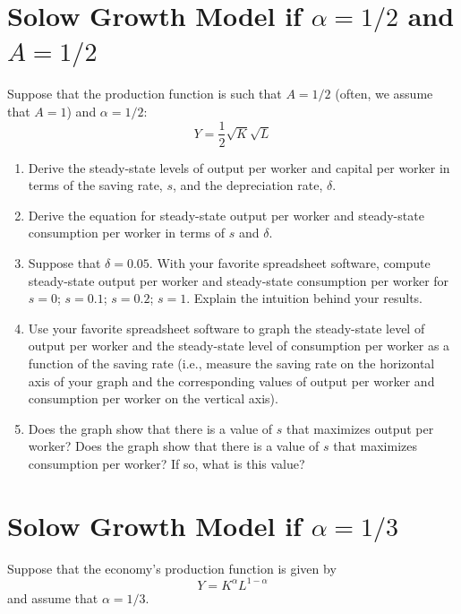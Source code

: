 \documentclass[]{book}
\theoremstyle{definition}
\theoremstyle{definition}
\theoremstyle{definition}
\theoremstyle{remark}
\begin{document}
\section{\texorpdfstring{Solow Growth Model if \(\alpha = 1/2\) and
\(A=1/2\)}{Solow Growth Model if \textbackslash{}alpha = 1/2 and A=1/2}}\label{solow-growth-model-if-alpha-12-and-a12}

Suppose that the production function is such that \(A=1/2\) (often, we
assume that \(A=1\)) and \(\alpha=1/2\):
\[Y=\frac{1}{2}\sqrt{K}\sqrt{L}\]

\begin{enumerate}
\def\labelenumi{\arabic{enumi}.}
\item
  Derive the steady-state levels of output per worker and capital per
  worker in terms of the saving rate, \(s\), and the depreciation rate,
  \(\delta\).
\item
  Derive the equation for steady-state output per worker and
  steady-state consumption per worker in terms of \(s\) and \(\delta\).
\item
  Suppose that \(\delta=0.05\). With your favorite spreadsheet software,
  compute steady-state output per worker and steady-state consumption
  per worker for \(s=0\); \(s=0.1\); \(s=0.2\); \(s=1\). Explain the
  intuition behind your results.
\item
  Use your favorite spreadsheet software to graph the steady-state level
  of output per worker and the steady-state level of consumption per
  worker as a function of the saving rate (i.e., measure the saving rate
  on the horizontal axis of your graph and the corresponding values of
  output per worker and consumption per worker on the vertical axis).
\item
  Does the graph show that there is a value of \(s\) that maximizes
  output per worker? Does the graph show that there is a value of \(s\)
  that maximizes consumption per worker? If so, what is this value?
\end{enumerate}

\section{\texorpdfstring{Solow Growth Model if
\(\alpha = 1/3\)}{Solow Growth Model if \textbackslash{}alpha = 1/3}}\label{solow-growth-model-if-alpha-13}

Suppose that the economy's production function is given by
\[Y=K^{\alpha}L^{1-\alpha}\] and assume that \(\alpha=1/3\).
\end{document}
